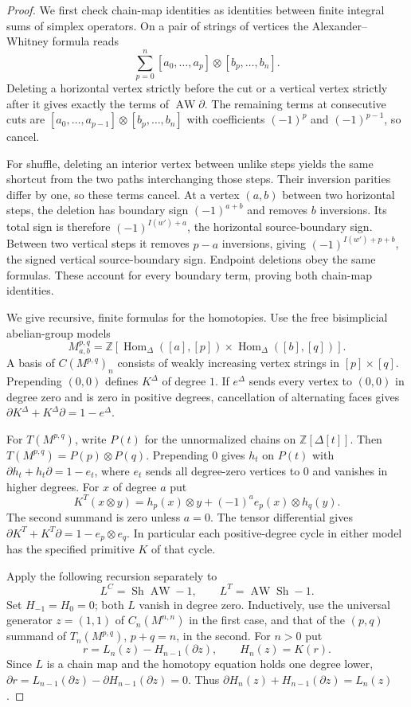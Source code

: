 \begin{proof}
We first check chain-map identities as identities between finite integral
sums of simplex operators. On a pair of strings of vertices the
Alexander--Whitney formula reads
\[
 \sum_{p=0}^n[a_0,\ldots,a_p]\otimes[b_p,\ldots,b_n].
\]
Deleting a horizontal vertex strictly before the cut or a vertical vertex
strictly after it gives exactly the terms of $\operatorname{AW}\partial$.
The remaining terms at consecutive cuts are
$[a_0,\ldots,a_{p-1}]\otimes[b_p,\ldots,b_n]$ with coefficients
$(-1)^p$ and $(-1)^{p-1}$, so cancel.

For shuffle, deleting an interior vertex between unlike steps yields the
same shortcut from the two paths interchanging those steps. Their inversion
parities differ by one, so these terms cancel. At a vertex $(a,b)$ between
two horizontal steps, the deletion has boundary sign $(-1)^{a+b}$ and
removes $b$ inversions. Its total sign is therefore
$(-1)^{I(w')+a}$, the horizontal source-boundary sign. Between two vertical
steps it removes $p-a$ inversions, giving
$(-1)^{I(w')+p+b}$, the signed vertical source-boundary sign.
Endpoint deletions obey the same formulas. These account for every boundary
term, proving both chain-map identities.

We give recursive, finite formulas for the homotopies. Use the free
bisimplicial abelian-group models
\[
 M^{p,q}_{a,b}=\mathbb Z[
 \operatorname{Hom}_\Delta([a],[p])\times
 \operatorname{Hom}_\Delta([b],[q])].
\]
A basis of $C(M^{p,q})_n$ consists of weakly increasing vertex strings
in $[p]\times[q]$. Prepending $(0,0)$ defines $K^\Delta$ of degree $1$.
If $e^\Delta$ sends every vertex to $(0,0)$ in degree zero and is zero
in positive degrees, cancellation of alternating faces gives
$\partial K^\Delta+K^\Delta\partial=1-e^\Delta$.

For $T(M^{p,q})$, write $P(t)$ for the unnormalized chains on
$\mathbb Z[\Delta[t]]$. Then $T(M^{p,q})=P(p)\otimes P(q)$.
Prepending $0$ gives $h_t$ on $P(t)$ with
$\partial h_t+h_t\partial=1-e_t$, where $e_t$ sends all degree-zero
vertices to $0$ and vanishes in higher degrees. For $x$ of degree $a$ put
\[
 K^T(x\otimes y)=h_p(x)\otimes y+(-1)^a e_p(x)\otimes h_q(y).
\]
The second summand is zero unless $a=0$. The tensor differential gives
$\partial K^T+K^T\partial=1-e_p\otimes e_q$.
In particular each positive-degree cycle in either model has the specified
primitive $K$ of that cycle.

Apply the following recursion separately to
\[
 L^C=\operatorname{Sh}\operatorname{AW}-1,
 \qquad L^T=\operatorname{AW}\operatorname{Sh}-1.
\]
Set $H_{-1}=H_0=0$; both $L$ vanish in degree zero. Inductively, use
the universal generator $z=(1,1)$ of $C_n(M^{n,n})$ in the first case,
and that of the $(p,q)$ summand of $T_n(M^{p,q})$, $p+q=n$, in the second.
For $n>0$ put
\[
 r=L_n(z)-H_{n-1}(\partial z),\qquad H_n(z)=K(r).
\]
Since $L$ is a chain map and the homotopy equation holds one degree lower,
$\partial r=L_{n-1}(\partial z)-\partial H_{n-1}(\partial z)=0$.
Thus $\partial H_n(z)+H_{n-1}(\partial z)=L_n(z)$.


\end{proof}
